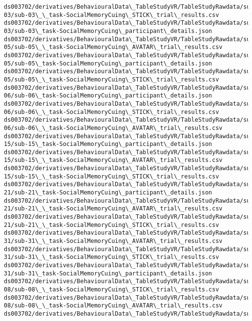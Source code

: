 \documentclass[11pt]{article}
\begin{document}
\begin{Verbatim}[commandchars=\\\{\}]
ds003702/derivatives/BehaviouralData\_TableStudyVR/TableStudyRawdata/sub-
03/sub-03\_\_task-SocialMemoryCuing\_STICK\_trial\_results.csv
ds003702/derivatives/BehaviouralData\_TableStudyVR/TableStudyRawdata/sub-
03/sub-03\_task-SocialMemoryCuing\_participant\_details.json
ds003702/derivatives/BehaviouralData\_TableStudyVR/TableStudyRawdata/sub-
05/sub-05\_\_task-SocialMemoryCuing\_AVATAR\_trial\_results.csv
ds003702/derivatives/BehaviouralData\_TableStudyVR/TableStudyRawdata/sub-
05/sub-05\_task-SocialMemoryCuing\_participant\_details.json
ds003702/derivatives/BehaviouralData\_TableStudyVR/TableStudyRawdata/sub-
05/sub-05\_\_task-SocialMemoryCuing\_STICK\_trial\_results.csv
ds003702/derivatives/BehaviouralData\_TableStudyVR/TableStudyRawdata/sub-
06/sub-06\_task-SocialMemoryCuing\_participant\_details.json
ds003702/derivatives/BehaviouralData\_TableStudyVR/TableStudyRawdata/sub-
06/sub-06\_\_task-SocialMemoryCuing\_STICK\_trial\_results.csv
ds003702/derivatives/BehaviouralData\_TableStudyVR/TableStudyRawdata/sub-
06/sub-06\_\_task-SocialMemoryCuing\_AVATAR\_trial\_results.csv
ds003702/derivatives/BehaviouralData\_TableStudyVR/TableStudyRawdata/sub-
15/sub-15\_task-SocialMemoryCuing\_participant\_details.json
ds003702/derivatives/BehaviouralData\_TableStudyVR/TableStudyRawdata/sub-
15/sub-15\_\_task-SocialMemoryCuing\_AVATAR\_trial\_results.csv
ds003702/derivatives/BehaviouralData\_TableStudyVR/TableStudyRawdata/sub-
15/sub-15\_\_task-SocialMemoryCuing\_STICK\_trial\_results.csv
ds003702/derivatives/BehaviouralData\_TableStudyVR/TableStudyRawdata/sub-
21/sub-21\_task-SocialMemoryCuing\_participant\_details.json
ds003702/derivatives/BehaviouralData\_TableStudyVR/TableStudyRawdata/sub-
21/sub-21\_\_task-SocialMemoryCuing\_AVATAR\_trial\_results.csv
ds003702/derivatives/BehaviouralData\_TableStudyVR/TableStudyRawdata/sub-
21/sub-21\_\_task-SocialMemoryCuing\_STICK\_trial\_results.csv
ds003702/derivatives/BehaviouralData\_TableStudyVR/TableStudyRawdata/sub-
31/sub-31\_\_task-SocialMemoryCuing\_AVATAR\_trial\_results.csv
ds003702/derivatives/BehaviouralData\_TableStudyVR/TableStudyRawdata/sub-
31/sub-31\_\_task-SocialMemoryCuing\_STICK\_trial\_results.csv
ds003702/derivatives/BehaviouralData\_TableStudyVR/TableStudyRawdata/sub-
31/sub-31\_task-SocialMemoryCuing\_participant\_details.json
ds003702/derivatives/BehaviouralData\_TableStudyVR/TableStudyRawdata/sub-
08/sub-08\_\_task-SocialMemoryCuing\_STICK\_trial\_results.csv
ds003702/derivatives/BehaviouralData\_TableStudyVR/TableStudyRawdata/sub-
08/sub-08\_\_task-SocialMemoryCuing\_AVATAR\_trial\_results.csv
ds003702/derivatives/BehaviouralData\_TableStudyVR/TableStudyRawdata/sub-

\end{Verbatim}
\end{document}

